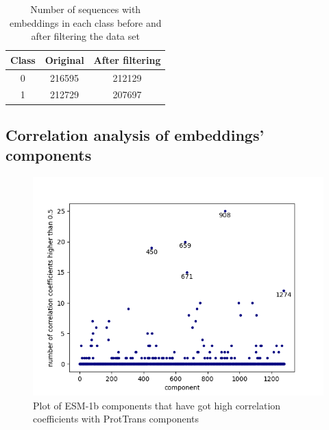 \documentclass[12pt]{article}
\begin{document}
	\begin{table}[h!]
		\caption{Number of sequences with embeddings in each class 
		before and after filtering the data set}
		\vspace{0.2cm}
		\centering
		\begin{tabular}{ | c | c c | }
			\hline 
			Class & Original & After filtering \\
			\hline 
			0 & 216595 & 212129 \\
			1 & 212729 & 207697 \\
			\hline    
		\end{tabular}
		\label{table:numberEmbeddingsClasses}
	\end{table}

	\newpage
	
	\subsection{Correlation analysis of embeddings' components}

	\begin{figure}[h!]
		\centering
		\includegraphics[scale=0.85]{validation_small_set_2_joined_correlation_high_corr.png}

		\caption{Plot of ESM-1b components that have got high correlation 
		coefficients with ProtTrans components}
		\label{figure:highCorrelationComponents}
	\end{figure}

	\newpage
\end{document}
